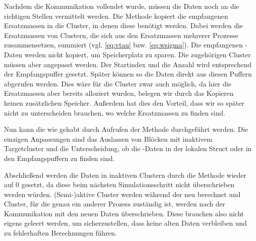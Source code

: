     Nachdem die Kommunikation vollendet wurde, müssen die Daten noch an die richtigen Stellen vermittelt werden. Die Methode  kopiert die empfangenen Ersatzmassen in die 
    Cluster, in denen diese benötigt werden. Dabei werden die Ersatzmassen von Clustern, die sich aus den Ersatzmassen mehrerer Prozesse zusammensetzen, summiert (vgl. \autoref{eq:vtau} bzw. 
    \autoref{eq:wsigma}). Die empfangenen -Daten werden nicht kopiert, um Speicherplatz zu sparen. Die zugehörigen Cluster müssen aber angepasst werden. Der Startindex und die 
    Anzahl wird entsprechend der Empfangspuffer gesetzt. Später können so die Daten direkt aus diesen Puffern abgerufen werden. Dies wäre für die Cluster zwar auch möglich, da hier die Ersatzmassen
    aber bereits alloziert wurden, belegen wir durch das Kopieren keinen zusätzlichen Speicher. Außerdem hat dies den Vorteil, dass wir so später nicht zu unterscheiden brauchen, wo welche Ersatzmassen
    zu finden sind.
    
    Nun kann die \koppl wie gehabt durch Aufrufen der Methode  durchgeführt werden. Die einzigen Anpassungen sind das Auslassen von Blöcken mit inaktivem Targetcluster und die 
    Unterscheidung, ob die -Daten in der lokalen  Struct oder in den Empfangspuffern zu finden sind.
    
    Abschließend werden die Daten in inaktiven Clustern durch die Methode  wieder auf $0$ gesetzt, da diese beim nächsten Simulationsschritt nicht überschrieben
    werden würden. (Semi-)aktive Cluster werden während der \vorw neu berechnet und Cluster, für die genau ein anderer Prozess zuständig ist, werden nach der Kommunikation mit den neuen Daten 
    überschrieben. Diese brauchen also nicht eigens geleert werden, um sicherzustellen, dass keine alten Daten verbleiben und zu fehlerhaften Berechnungen führen.
    
